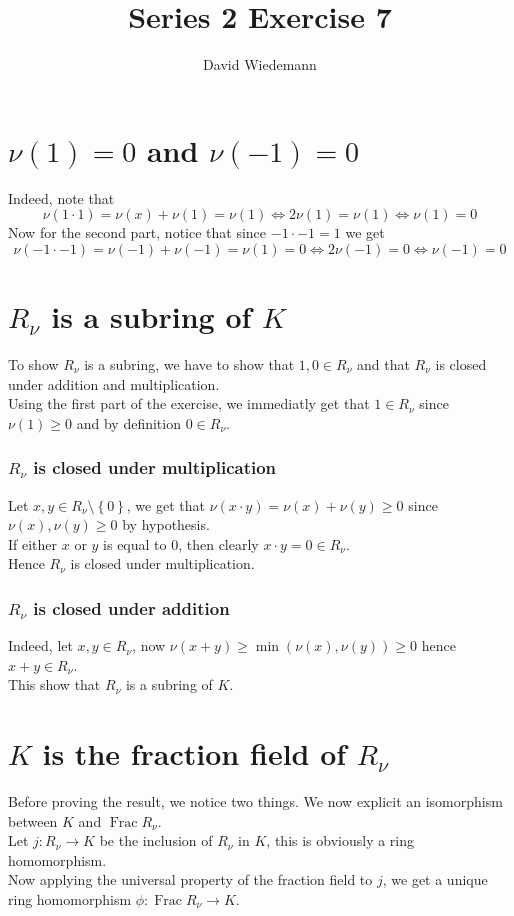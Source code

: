 \documentclass[11pt, a4paper]{article}
\DeclareMathOperator{\fr}{Frac}
\begin{document}
\title{Series 2 Exercise 7}
\author{David Wiedemann}
\maketitle
\section*{$\nu( 1) = 0$ and $\nu( -1) =0$  }
Indeed, note that 
\[ 
\nu( 1\cdot 1) = \nu( x) +\nu( 1) = \nu(1) \iff 2\nu( 1) =\nu( 1) \iff \nu( 1) =0
\]
Now for the second part, notice that since $-1\cdot -1 = 1$ we get
\[ 
\nu( -1\cdot -1) = \nu( -1) +\nu( -1) = \nu( 1) = 0\iff 2\nu( -1) =0 \iff \nu( -1) =0
\]
\section*{$R_\nu$ is a subring of $K$ }
To show $R_\nu$ is a subring, we have to show that $  1,0\in R_{\nu} $ and that $R_\nu$  is closed under addition and multiplication.\\

Using the first part of the exercise, we immediatly get that $1\in R_\nu$ since $\nu( 1) \geq 0$  and by definition $0\in R_\nu$.\\
\subsubsection*{ $R_\nu$ is closed under multiplication}
Let $x,y \in R_\nu\setminus \left\{ 0 \right\} 	$, we get that $\nu( x\cdot y) = \nu( x) +\nu( y) \geq 0$ since $\nu( x) ,\nu( y) \geq 0$ by hypothesis.\\
If either $x$ or $y$ is equal to 0, then clearly $x\cdot y = 0\in R_\nu.$\\
Hence $R_\nu$ is closed under multiplication.
\subsubsection*{ $R_\nu$ is closed under addition}
Indeed, let $x,y\in R_\nu$, now $ \nu( x+y) \geq \min ( \nu( x) ,\nu( y) ) \geq 0$ hence $x+y\in R_\nu$.\\

This show that $R_\nu$ is a subring of $K$.
\section*{$K$ is the fraction field of $R_\nu$ }
Before proving the result, we notice two things.
We now explicit an isomorphism between $K$ and $\fr R_\nu$.\\
Let $j: R_\nu \to K$ be the inclusion of $R_\nu$ in $K$, this is obviously a ring homomorphism.\\
Now applying the universal property of the fraction field to $j$, we get a unique ring homomorphism $\phi: \fr R_\nu\to K$.\\
\end{document}
